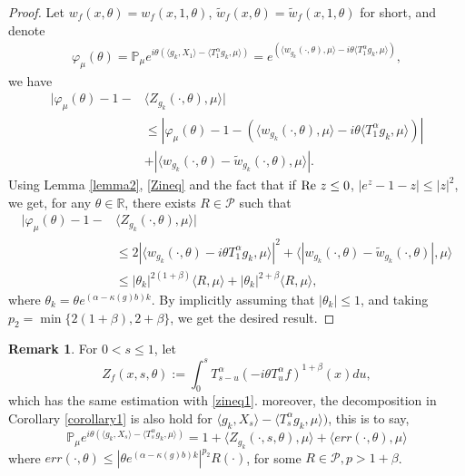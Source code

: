 \documentclass[12pt, a4paper]{amsart}
\theoremstyle{definition}
\newtheorem{rem}[thm]{Remark}
\numberwithin{equation}{section}
\begin{document}
\begin{proof}
    Let $ w_f(x,\theta)=w_f(x,1,\theta)$, $\tilde{w}_f(x,\theta)=\tilde{w}_f(x,1,\theta)$ for short, and denote
\begin{align}\label{charfirst}
    \varphi_{\mu}(\theta)=\mathbb{P}_{\mu}e^{i\theta(\langle g_k, X_1\rangle-\langle T_1^{\alpha}g_k,\mu \rangle)}=e^{(\langle w_{g_k}(\cdot,\theta),\mu \rangle-i\theta \langle T_1^{\alpha} g_k, \mu \rangle)},
\end{align}
 we have
\begin{align*}
    |\varphi_{\mu}(\theta)-1-& \langle Z_{g_k}(\cdot, \theta),\mu\rangle|\\
    &\leq|\varphi_{\mu}(\theta)-1-\left( \langle w_{g_k}(\cdot,\theta), \mu \rangle-i\theta \langle T_1^{\alpha}g_k,\mu\rangle\right)|\\
    &+|\langle w_{g_k}(\cdot,\theta)-\tilde{w}_{g_k}(\cdot,\theta),\mu \rangle|.
\end{align*}
Using Lemma \ref{lemma2}, \eqref{Zineq} and the fact that if $ {\rm Re~} z\leq 0$, $|e^z-1-z|\leq|z|^2$,   we get, for any $\theta \in \mathbb{R}$, there exists $R\in \mathcal{P}$ such that 
\begin{align*}
    |\varphi_{\mu}(\theta)-1-& \langle Z_{g_k}(\cdot, \theta),\mu\rangle|\\
    &\leq 2|\langle w_{g_k}(\cdot,\theta)-i\theta T_1^{\alpha}g_k, \mu \rangle|^2 + \langle |w_{g_k}(\cdot,\theta)-\tilde{w}_{g_k}(\cdot,\theta)|, \mu \rangle\\
    &\leq |\theta_{k}|^{2(1+\beta)}\langle R,\mu\rangle + |\theta_{k}|^{2+\beta}\langle R,\mu\rangle,
\end{align*}
where $\theta_k=\theta e^{(\alpha-\kappa(g)b)k}$. By implicitly assuming that $|\theta_k|\leq 1$, and taking $p_2=\min \{2(1+\beta), 2+\beta\}$, we get the desired result.
\end{proof}  
\begin{rem}\label{remark1}
   For $0<s\leq 1$, let 
   $$Z_f(x,s,\theta):=\int_0^s T^{\alpha}_{s-u}(-i\theta T_u^{\alpha}f)^{1+\beta}(x)du ,$$
   which has the same estimation with \eqref{zineq1}. moreover, the decomposition in Corollary \ref{corollary1} is also hold for $\langle g_k, X_s\rangle-\langle T_s^{\alpha}g_k,\mu \rangle)$, this is to say,
   $$\mathbb{P}_{\mu}e^{i\theta(\langle g_k, X_s\rangle-\langle T_s^{\alpha}g_k,\mu \rangle)}=1+\langle Z_{g_k}(\cdot,s,\theta),\mu\rangle+\langle err(\cdot,\theta),\mu\rangle$$
   where $err(\cdot,\theta)\leq |\theta e^{(\alpha-\kappa(g)b)k}|^{p_2}R(\cdot)$, for some $R\in \mathcal{P}, p>1+\beta$.
\end{rem}
\end{document}
